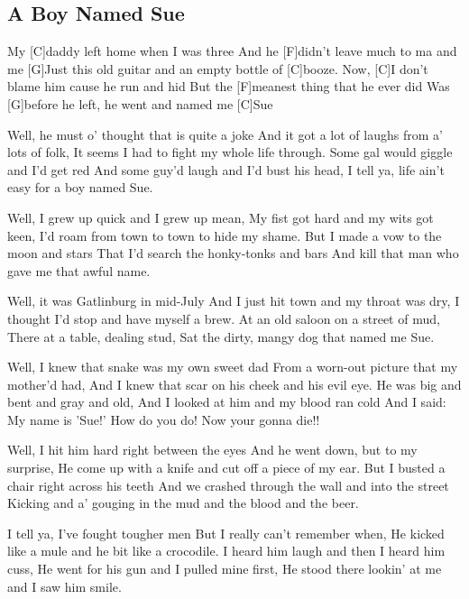 \subsection*{A Boy Named Sue   }



\begin{guitar}

My [C]daddy left home when I was three
And he [F]didn't leave much to ma and me
[G]Just this old guitar and an empty bottle of [C]booze.
Now, [C]I don't blame him cause he run and hid
But the [F]meanest thing that he ever did
Was [G]before he left, he went and named me [C]Sue


Well, he must o' thought that is quite a joke
And it got a lot of laughs from a' lots of folk,
It seems I had to fight my whole life through.
Some gal would giggle and I'd get red
And some guy'd laugh and I'd bust his head,
I tell ya, life ain't easy for a boy named Sue.

Well, I grew up quick and I grew up mean,
My fist got hard and my wits got keen,
I'd roam from town to town to hide my shame.
But I made a vow to the moon and stars
That I'd search the honky-tonks and bars
And kill that man who gave me that awful name.

Well, it was Gatlinburg in mid-July
And I just hit town and my throat was dry,
I thought I'd stop and have myself a brew.
At an old saloon on a street of mud,
There at a table, dealing stud,
Sat the dirty, mangy dog that named me Sue.

Well, I knew that snake was my own sweet dad
From a worn-out picture that my mother'd had,
And I knew that scar on his cheek and his evil eye.
He was big and bent and gray and old,
And I looked at him and my blood ran cold
And I said: My name is 'Sue!' How do you do!
Now your gonna die!!

Well, I hit him hard right between the eyes
And he went down, but to my surprise,
He come up with a knife and cut off a piece of my ear.
But I busted a chair right across his teeth
And we crashed through the wall and into the street
Kicking and a' gouging in the mud and the blood and the beer.

I tell ya, I've fought tougher men
But I really can't remember when,
He kicked like a mule and he bit like a crocodile.
I heard him laugh and then I heard him cuss,
He went for his gun and I pulled mine first,
He stood there lookin' at me and I saw him smile.


\end{guitar}
